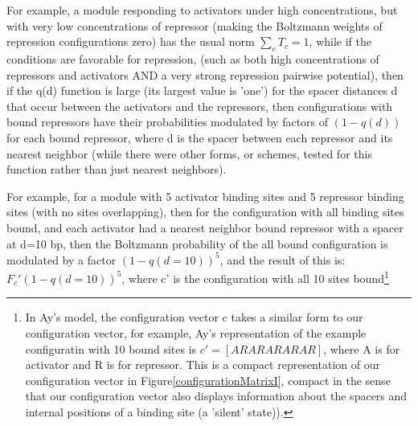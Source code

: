  For example, a module responding to activators under high concentrations, but with very low concentrations of repressor (making the Boltzmann weights of repression configurations zero) has the usual norm $\sum_c T_c=1$, while if the conditions are favorable for repression, (such as both high concentrations of repressors and activators AND a very strong repression pairwise potential), then if the q(d) function is large (its largest value is 'one') for the spacer distances d that occur between the activators and the repressors, then configurations with bound repressors have their probabilities modulated by factors of $(1-q(d))$ for each bound repressor, where d is the spacer between each repressor and its nearest neighbor (while there were other forms, or schemes, tested for this function rather than just nearest neighbors).  
 
 For example, for a module with 5 activator binding sites and 5 repressor binding sites (with no sites overlapping), then for the configuration with all binding sites bound, and each activator had a nearest neighbor bound repressor with a spacer at d=10 bp, then the Boltzmann probability of the all bound configuration is modulated by a factor $(1-q(d=10))^{5}$, and the result of this is: $F_c'(1-q(d=10))^{5}$, where c' is the configuration with all 10 sites bound\footnote{In Ay's model, the configuration vector c takes a similar form to our configuration vector, for example, Ay's representation of the example configuratin with 10 bound sites is $c'=[ARARARARAR]$, where A is for activator and R is for repressor.  This is a compact representation of our configuration vector in Figure\ref{configurationMatrixI}, compact in the sense that our configuration vector also displays information about the spacers and internal positions of a binding site (a 'silent' state)).}
 
